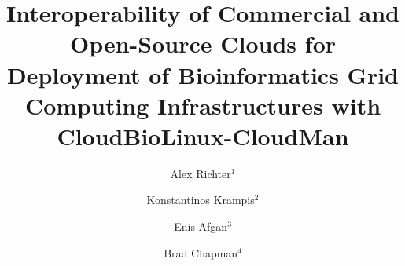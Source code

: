 \documentclass[10pt]{bmc_article}
\newenvironment{bmcformat}{\baselineskip20pt\sloppy\setboolean{publ}{false}}{\baselineskip20pt\sloppy}
\begin{document}
\begin{bmcformat}



\title{Interoperability of Commercial and Open-Source Clouds for Deployment of Bioinformatics Grid Computing Infrastructures with  CloudBioLinux-CloudMan}
 

\author{
             Alex Richter$^{1}$%
             \and
             Konstantinos Krampis\correspondingauthor$^{2}$%
             \and
             Enis Afgan\correspondingauthor$^{3}$%
             \and
             Brad Chapman\correspondingauthor$^{4}$%
             }



\address{ \\
\iid(1) Informatics Department, J. Craig Venter Institute, 10355 Science Center Dr., San Diego, CA 92121, USA \\
\iid(2) Informatics Department, J. Craig Venter Institute, 9704 Medical Center Dr., Rockville, MD 20850, USA  \\
\iid(3) Center for Informatics and Computing, Ruder Boskovic Institute, Zagreb, Croatia   \\
\iid(4) Dept. of Biostatistics, Harvard School of Public Health, 655 Huntington Avenue, Boston, MA, 02115, USA  \\
}


\end{bmcformat}
\end{document}
